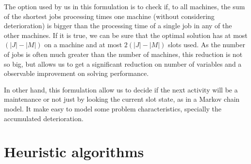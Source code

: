 \documentclass[a4paper,11pt]{article}
\begin{document}
The option used by us in this formulation is to check if, to all machines, the sum of the shortest jobs processing times one machine (without considering deterioration) is bigger than the processing time of a single job in any of the other machines. If it is true, we can be sure that the optimal solution has at most $(|J| - |M|)$ on a machine and at most $2(|J| - |M|)$ slots used. As the number of jobs is often much greater than the number of machines, this reduction is not so big, but allows us to get a significant reduction on number of variables and a observable improvement on solving performance.  

In other hand, this formulation allow us to decide if the next activity will be a maintenance or not just by looking the current slot state, as in a Markov chain model. It make easy to model some problem characteristics, specially the accumulated deterioration. 

\section{Heuristic algorithms}




~\\


\end{document}
